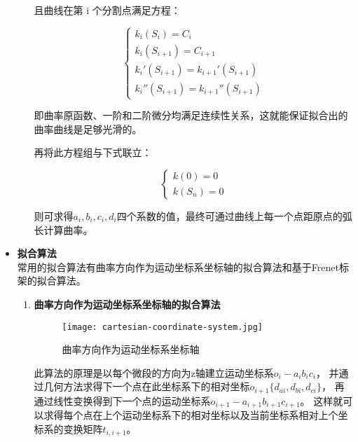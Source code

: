 \begin{itemize}
\begin{enumerate}[label=(\Alph*)]
        且曲线在第 i 个分割点满足方程：

        \begin{equation}
        \left\{
            \begin{array}{lr}
            k_i(S_i) = C_i
        \\
            k_i(S_{i+1}) = C_{i+1}
        \\
            k_i'(S_{i+1}) = k_{i+1}'(S_{i+1})
        \\
            k_i''(S_{i+1}) = k_{i+1}''(S_{i+1})
            \end{array}
        \right.
        \end{equation}

        即曲率原函数、一阶和二阶微分均满足连续性关系，这就能保证拟合出的曲率曲线是足够光滑的。

        再将此方程组与下式联立：

        \begin{equation}
        \left\{
            \begin{array}{lr}
            k(0) = 0
        \\
            k(S_n) = 0
            \end{array}
        \right.
        \end{equation}

        则可求得$a_i, b_i, c_i, d_i$四个系数的值，最终可通过曲线上每一个点距原点的弧长计算曲率。
    \end{enumerate}

    \item \textbf{拟合算法} \\

    常用的拟合算法有曲率方向作为运动坐标系坐标轴的拟合算法和基于Frenet标架的拟合算法。

    \begin{enumerate}[label=(\Alph*)]
        \item \textbf{曲率方向作为运动坐标系坐标轴的拟合算法} \\

        \begin{figure}[H]
        \centering
        \texttt{[image: cartesian-coordinate-system.jpg]}
        \caption{曲率方向作为运动坐标系坐标轴\cite{用于光纤光栅曲线重建算法的坐标点拟合}}
        \end{figure}

        此算法的原理是以每个微段的方向为z轴建立运动坐标系$o_i-a_ib_ic_i$，
        并通过几何方法求得下一个点在此坐标系下的相对坐标\cite{3d-shape-display}$o_{i+1} \{d_{ai}, d_{bi}, d_{ci}\}$，
        再通过线性变换得到下一个点的运动坐标系\cite{three-dimensional-curve}$o_{i+1}-a_{i+1}b_{i+1} c_{i+1}$。
        这样就可以求得每个点在上个运动坐标系下的相对坐标以及当前坐标系相对上个坐标系的变换矩阵$t_{i, i+1}$。


\end{enumerate}
\end{itemize}
